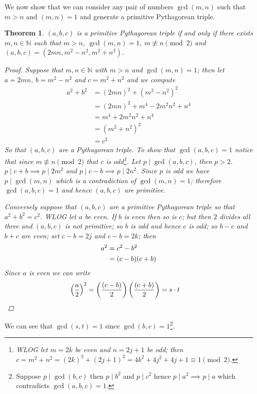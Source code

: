 \documentclass[oneside,12pt]{book}   	%
\newcounter{ex}
\newcounter{pr}
\newtheorem{thm}{Theorem}[chapter]
\theoremstyle{definition}
\begin{document}
\begin{spacing}{1.618}
			We now show that we can consider any pair of numbers $\gcd{(m,n)}$ such that $m>n$ and $(m,n)=1$ and generate a primitive Pythagorean triple. 
			\begin{thm}
				$(a, b, c)$ is a primitive Pythagorean triple if and only if there exists $m, n\in\mathbb{N}$ such that $m>n$, $\gcd{(m, n)}=1$, $m\not\equiv n\pmod 2$ and $(a, b, c)=\left(2mn, m^2-n^2, m^2+n^2\right)$. 
				\begin{proof}
					Suppose that $m, n\in\mathbb{N}$ with $m>n$ and $\gcd{(m, n)}=1$; then let $a=2mn$, $b=m^2-n^2$ and $c=m^2+n^2$ and we compute
					\begin{alignat*}{4}
						a^2+b^2&=(2mn)^2 + \left(m^2-n^2\right)^2 \\
							&=(2mn)^2 + m^4 -2m^2n^2 + n^4 \\
							&=m^4+2m^2n^2 + n^4  \\
							&=\left(m^2+n^2\right)^2 \\
							&=c^2
					\end{alignat*}
					So that $(a, b, c)$ are a Pythagorean triple. To show that $\gcd{(a, b, c)}=1$ notice that since $m\not\equiv n\pmod{2}$ that $c$ is odd\footnote{WLOG let $m=2k$ be even and $n=2j+1$ be odd; then $c=m^2+n^2=(2k)^2+(2j+1)^2=4k^2+4j^2+4j+1\equiv 1\pmod{2}$.}. Let $p\mid \gcd{(a, b, c)}$, then $p>2$. $p\mid c+b\implies p\mid 2m^2$ and $p\mid c-b\implies p\mid 2n^2$. Since $p$ is odd we have $p\mid \gcd{(m, n)}$ which is a contradiction of $\gcd{(m, n)}=1$; therefore $\gcd{(a, b, c)}=1$ and hence $(a, b, c)$ are primitive.
					
					Conversely suppose that $(a, b, c)$ are a primitive Pythagorean triple so that $a^2+b^2=c^2$. WLOG let $a$ be even. If $b$ is even then so is $c$; but then $2$ divides all three and $(a, b, c)$ is not primitive; so $b$ is odd and hence $c$ is odd; so $b-c$ and $b+c$ are even; set $c-b=2j$ and $c-b=2k$; then 
					\begin{alignat}{4}
						a^2&=c^2-b^2 \notag \\
							&=(c-b)(c+b) \notag 
					\end{alignat} 
					Since $a$ is even we can write 
					\begin{alignat}{4}
						\left(\frac{a}{2}\right)^2&=\left(\frac{(c-b)}{2}\right)\left(\frac{(c+b)}{2}\right)=s\cdot t \notag 
					\end{alignat}
				\end{proof}
			\end{thm}
			We can see that $\gcd{(s, t)}=1$ since $\gcd{(b, c)}=1$\footnote{Suppose $p\mid\gcd{(b,c)}$ then $p\mid b^2$ and $p\mid c^2$ hence $p\mid a^2\implies p\mid a$ which contradicts $\gcd{(a, b, c)}=1$.}. 
			

\end{spacing}
\end{document}
